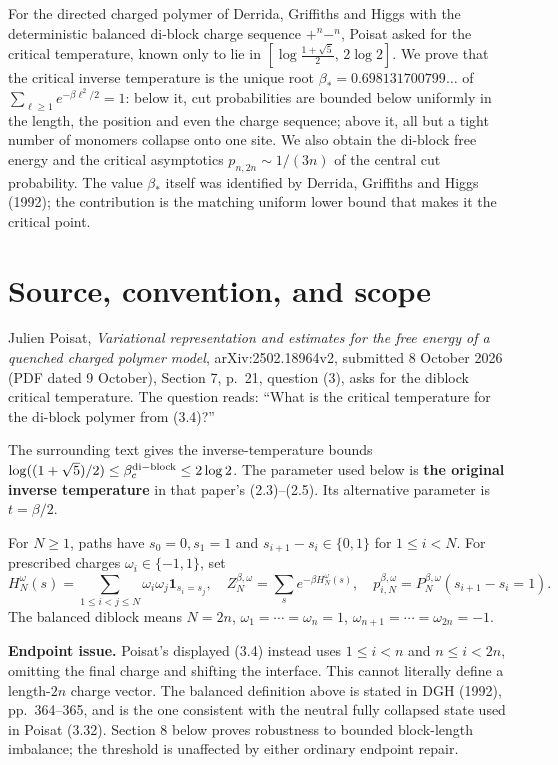 \documentclass[11pt,a4paper]{report}
\begin{document}
\makepapertitle

\begin{paperabstract}
For the directed charged polymer of Derrida, Griffiths and Higgs with the deterministic balanced di-block charge
sequence \(+^n-^n\), Poisat asked for the critical temperature, known only to lie in
\([\log\frac{1+\sqrt5}{2},\,2\log2]\). We prove that the critical inverse temperature is the unique root
\(\beta_*=0.698131700799\ldots\) of \(\sum_{\ell\ge1}e^{-\beta\ell^2/2}=1\): below it, cut probabilities are bounded
below uniformly in the length, the position and even the charge sequence; above it, all but a tight number of
monomers collapse onto one site. We also obtain the di-block free energy and the critical asymptotics
\(p_{n,2n}\sim1/(3n)\) of the central cut probability. The value \(\beta_*\) itself was identified by Derrida,
Griffiths and Higgs (1992); the contribution is the matching uniform lower bound that makes it the critical point.
\end{paperabstract}

\section{Source, convention, and scope}

Julien Poisat, \emph{Variational representation and estimates for the free energy of a quenched charged polymer model}, arXiv:2502.18964v2, submitted 8 October 2026 (PDF dated 9 October), Section 7, p.~21, question (3), asks for the diblock critical temperature. The question reads: ``What is the critical temperature for the di-block polymer from (3.4)?''

The surrounding text gives the inverse-temperature bounds \(\log((1+\sqrt5)/2)\leq\beta_c^{\rm di-block}\leq2\log2\). The parameter used below is \textbf{the original inverse temperature} in that paper's (2.3)--(2.5). Its alternative parameter is \(t=\beta/2\).

For \(N\geq1\), paths have \(s_0=0,s_1=1\) and \(s_{i+1}-s_i\in\{0,1\}\) for \(1\leq i<N\). For prescribed charges \(\omega_i\in\{-1,1\}\), set
\[H_N^\omega(s)=\sum_{1\leq i<j\leq N}\omega_i\omega_j\mathbf1_{s_i=s_j},\quad
 Z_N^{\beta,\omega}=\sum_s e^{-\beta H_N^\omega(s)},\quad
 p_{i,N}^{\beta,\omega}=P_N^{\beta,\omega}(s_{i+1}-s_i=1).\]
The balanced diblock means \(N=2n\), \(\omega_1=\cdots=\omega_n=1\), \(\omega_{n+1}=\cdots=\omega_{2n}=-1\).

\textbf{Endpoint issue.} Poisat's displayed (3.4) instead uses \(1\leq i<n\) and \(n\leq i<2n\), omitting the final charge and shifting the interface. This cannot literally define a length-\(2n\) charge vector. The balanced definition above is stated in DGH (1992), pp.~364--365, and is the one consistent with the neutral fully collapsed state used in Poisat (3.32). Section 8 below proves robustness to bounded block-length imbalance; the threshold is unaffected by either ordinary endpoint repair.
\end{document}
